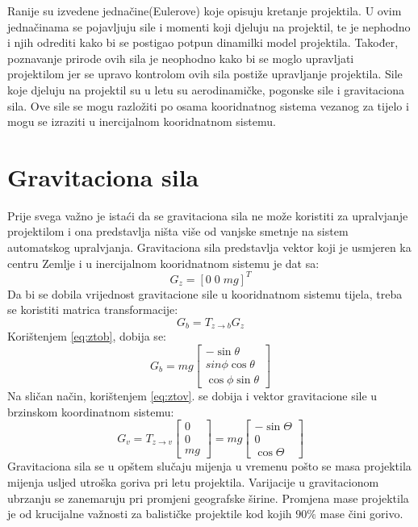 Ranije su izvedene jednačine(Eulerove) koje opisuju kretanje projektila. U ovim jednačinama se 
pojavljuju sile i momenti koji djeluju na projektil, te je nephodno i njih odrediti kako bi 
se postigao potpun dinamilki model projektila. Također, poznavanje prirode ovih sila je neophodno kako 
bi se moglo upravljati projektilom jer se upravo kontrolom ovih sila postiže upravljanje projektila.
Sile koje djeluju na projektil su u letu su aerodinamičke, pogonske sile i 
gravitaciona sila. Ove sile se mogu razložiti po osama kooridnatnog sistema vezanog 
za tijelo i mogu se izraziti u inercijalnom kooridnatnom sistemu. 
\section{Gravitaciona sila}
Prije svega važno je istaći da se gravitaciona sila ne može koristiti za upralvjanje projektilom i 
ona predstavlja ništa više od vanjske smetnje na sistem automatskog upralvjanja.
Gravitaciona sila predstavlja vektor koji je usmjeren ka centru Zemlje i u inercijalnom kooridnatnom
sistemu je dat sa:
\begin{equation}
    G_{z}=[0\;  0\;  mg]^T
\end{equation}
Da bi se dobila vrijednost gravitacione sile u kooridnatnom sistemu tijela, treba se koristiti matrica 
transformacije:
\begin{equation}
    G_{b} = T_{z\to b}G_{z}
\end{equation}
Korištenjem \ref{eq:ztob}, dobija se:
\begin{equation}
    G_b = mg\begin{bmatrix}
        -\sin\theta \\
        sin\phi\cos\theta \\
        \cos\phi\sin\theta
    \end{bmatrix}
\end{equation}
Na sličan način, korištenjem \ref{eq:ztov}.  se dobija i vektor gravitacione sile u brzinskom koordinatnom sistemu:
\begin{equation}
    G_v = T_{z\to v}\begin{bmatrix}
        0 \\ 0 \\ mg\end{bmatrix} = mg\begin{bmatrix}
            -\sin\Theta \\ 0 \\ \cos\Theta
    \end{bmatrix}
\end{equation}
Gravitaciona sila se u opštem slučaju mijenja u vremenu pošto se masa projektila mijenja usljed utroška goriva
pri letu projektila. Varijacije u gravitacionom ubrzanju se zanemaruju pri promjeni geografske širine.  
Promjena mase projektila je od krucijalne važnosti za balističke projektile kod kojih $90\%$ mase čini gorivo.
